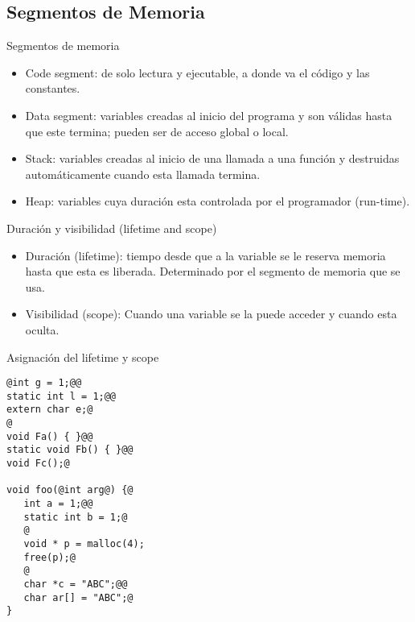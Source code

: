\subsection{Segmentos de Memoria} 
\begin{frame}[fragile,label=SM]{Segmentos de memoria}
   \begin{itemize}
      \item<1-> Code segment: de solo lectura y ejecutable, a donde va el c\'odigo y las constantes.
      \item<2-> Data segment: variables creadas al inicio del programa y son v\'alidas hasta que este termina; pueden ser de acceso global o local.
      \item<3-> Stack: variables creadas al inicio de una llamada a una funci\'on y destruidas autom\'aticamente cuando esta llamada termina.
      \item<4-> Heap: variables cuya duraci\'on esta controlada por el programador (run-time).
   \end{itemize}
\end{frame}
\begin{frame}[fragile,label=LS]{Duraci\'on y visibilidad (lifetime and scope)}
   \begin{itemize}
       \item<1-> Duraci\'on (lifetime): tiempo desde que a la variable se le reserva memoria hasta que esta es liberada. Determinado por el segmento de memoria que se usa.
       \item<2-> Visibilidad (scope): Cuando una variable se la puede acceder y cuando esta oculta.
   \end{itemize}
\end{frame}
\begin{frame}[fragile]{Asignaci\'on del lifetime y scope}
         \begin{lstlisting}[style=dimmided]
@int g = 1;@@
static int l = 1;@@
extern char e;@
@
void Fa() { }@@
static void Fb() { }@@
void Fc();@

void foo(@int arg@) {@
   int a = 1;@@
   static int b = 1;@
   @
   void * p = malloc(4);
   free(p);@
   @
   char *c = "ABC";@@
   char ar[] = "ABC";@
}
         \end{lstlisting}
\end{frame}
